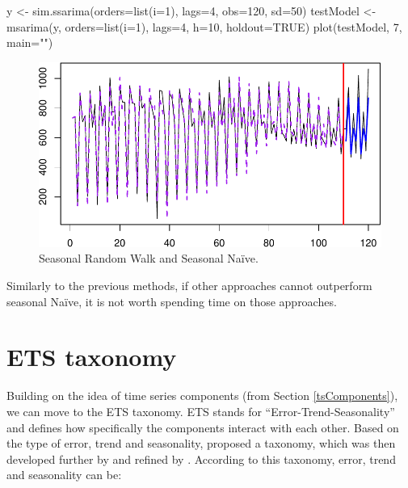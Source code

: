 \documentclass[
]{book}
\newenvironment{Shaded}{\begin{snugshade}}{\end{snugshade}}
\newcommand{\AttributeTok}[1]{\textcolor[rgb]{0.77,0.63,0.00}{#1}}
\newcommand{\ConstantTok}[1]{\textcolor[rgb]{0.00,0.00,0.00}{#1}}
\newcommand{\DecValTok}[1]{\textcolor[rgb]{0.00,0.00,0.81}{#1}}
\newcommand{\FunctionTok}[1]{\textcolor[rgb]{0.00,0.00,0.00}{#1}}
\newcommand{\NormalTok}[1]{#1}
\newcommand{\OtherTok}[1]{\textcolor[rgb]{0.56,0.35,0.01}{#1}}
\newcommand{\StringTok}[1]{\textcolor[rgb]{0.31,0.60,0.02}{#1}}
\theoremstyle{definition}
\theoremstyle{definition}
\theoremstyle{definition}
\theoremstyle{definition}
\theoremstyle{remark}
\begin{document}
\begin{Shaded}
\begin{Highlighting}[]
\NormalTok{y }\OtherTok{\textless{}{-}} \FunctionTok{sim.ssarima}\NormalTok{(}\AttributeTok{orders=}\FunctionTok{list}\NormalTok{(}\AttributeTok{i=}\DecValTok{1}\NormalTok{), }\AttributeTok{lags=}\DecValTok{4}\NormalTok{,}
                 \AttributeTok{obs=}\DecValTok{120}\NormalTok{, }\AttributeTok{sd=}\DecValTok{50}\NormalTok{)}
\NormalTok{testModel }\OtherTok{\textless{}{-}} \FunctionTok{msarima}\NormalTok{(y, }\AttributeTok{orders=}\FunctionTok{list}\NormalTok{(}\AttributeTok{i=}\DecValTok{1}\NormalTok{), }\AttributeTok{lags=}\DecValTok{4}\NormalTok{,}
                     \AttributeTok{h=}\DecValTok{10}\NormalTok{, }\AttributeTok{holdout=}\ConstantTok{TRUE}\NormalTok{)}
\FunctionTok{plot}\NormalTok{(testModel, }\DecValTok{7}\NormalTok{, }\AttributeTok{main=}\StringTok{""}\NormalTok{)}
\end{Highlighting}
\end{Shaded}

\begin{figure}
\centering
\includegraphics{Svetunkov--2022----ADAM_files/figure-latex/NaiveSeasonalExample-1.pdf}
\caption{\label{fig:NaiveSeasonalExample}Seasonal Random Walk and Seasonal Naïve.}
\end{figure}

Similarly to the previous methods, if other approaches cannot outperform seasonal Naïve, it is not worth spending time on those approaches.

\hypertarget{ETSTaxonomy}{%
\section{ETS taxonomy}\label{ETSTaxonomy}}

Building on the idea of time series components (from Section \ref{tsComponents}), we can move to the ETS taxonomy. ETS stands for ``Error-Trend-Seasonality'' and defines how specifically the components interact with each other. Based on the type of error, trend and seasonality, \citet{Pegels1969} proposed a taxonomy, which was then developed further by \citet{Hyndman2002} and refined by \citet{Hyndman2008b}. According to this taxonomy, error, trend and seasonality can be:
\end{document}
